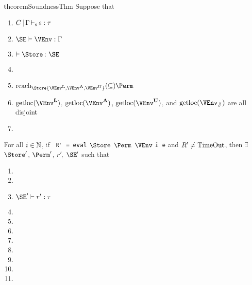 \begin{restatable}{theorem}{SoundnessThm}\label{thm:soundness}
  Suppose that
  \begin{enumerate}[({A}1)]
  \item $C \operatorname{|} \Gamma \operatorname{\vdash_s} e : \tau$
  \item $\SE \vdash \VEnv : \E$
  \item $\vdash \Store : \SE$
  \item\label{item:11} \assumeWellformed{}
  \item\label{item:12} $\Reach\Store{\Active\VEnv, \MutableBorrows\VEnv,
      \ImmutableBorrows\VEnv} \subseteq \Perm$
  \item $\Rawloc{\Active\VEnv}$,
    $\Rawloc{\MutableBorrows\VEnv}$,
    $\Rawloc{\ImmutableBorrows\VEnv}$, and
    $\Rawloc{\Suspended\VEnv}$ are all disjoint
  \item\label{item:15} \assumeIncoming{}{}
  \end{enumerate}
  For all $i\in\mathbb{N}$, if
  \ \lstinline[style=rule]{R' = eval} $\Store$ $\Perm$ $\VEnv$ \lstinline[style=rule]{i e}
  and $R'\ne \operatorname{TimeOut}$,
  then
  $\exists$ $\Store'$, $\Perm'$, $r'$, $\SE'$ such that
  \begin{enumerate}[({R}1)]
  \item {}
  \item {}
  \item $\SE' \vdash r' : \tau$
  \item {}
  \item {}
  \item {}
  \item {}
  \item {}
  \item {}
  \item {}
  \item {}
  \end{enumerate}
\end{restatable}

